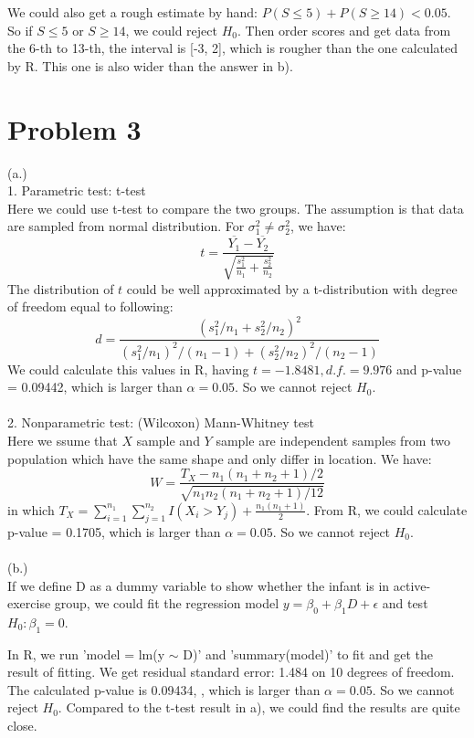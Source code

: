 \documentclass[twoside,11pt]{homework}
\begin{document}
We could also get a rough estimate by hand:
$P(S\le 5) + P(S \ge 14) < 0.05$. 
So if $S \le 5$ or $S \ge 14$, we could reject $H_0$.
Then order scores and get data from the 6-th to 13-th, the interval is [-3, 2], which is rougher than the one calculated by R.
This one is also wider than the answer in b). 
\section*{Problem 3}
(a.) \\
1. Parametric test: t-test\\
Here we could use t-test to compare the two groups.
The assumption is that data are sampled from normal distribution.
For $\sigma_1^2 \neq \sigma_2^2$, we have:
%
\begin{equation}
t = \frac{\overline{Y_1} - \overline{Y_2}}{\sqrt{\frac{s_1^2}{n_1}+\frac{s_2^2}{n_2}}}
\end{equation}
%
The distribution of $t$ could be well approximated by a t-distribution with degree of freedom equal to following:
%
\begin{equation}
d = \frac{(s_1^2/n_1 + s_2^2/n_2)^2}{(s_1^2/n_1)^2/(n_1 - 1) + (s_2^2/n_2)^2/(n_2 - 1)}
\end{equation}
%
We could calculate this values in R, having $t=-1.8481, d.f.=9.976$ and p-value = 0.09442, which is larger than $\alpha = 0.05$.
So we cannot reject $H_0$.
\\\\
2. Nonparametric test: (Wilcoxon) Mann-Whitney test\\
Here we ssume that $X$ sample and $Y$ sample are independent samples from two population which have the same shape and only differ in location.
We have:
%
\begin{equation}
W = \frac{T_X - n_1(n_1+n_2+1)/2}{\sqrt{n_1 n_2 (n_1+n_2+1)/12}}
\end{equation}
%
in which $T_X = \sum_{i=1}^{n_1}\sum_{j=1}^{n_2}I(X_i > Y_j) + \frac{n_1(n_1+1)}{2}$.
From R, we could calculate p-value = 0.1705, which is larger than $\alpha = 0.05$.
So we cannot reject $H_0$.
\\\\
(b.)\\
If we define D as a dummy variable to show whether the infant is in active-exercise group, we could fit the regression model $y=\beta_0+\beta_1 D + \epsilon$ and test $H_0: \beta_1 = 0$.

In R, we run 'model = lm(y $\sim$ D)' and 'summary(model)' to fit and get the result of fitting.
We get residual standard error: 1.484 on 10 degrees of freedom.
The calculated p-value is 0.09434, , which is larger than $\alpha = 0.05$.
So we cannot reject $H_0$.
Compared to the t-test result in a), we could find the results are quite close.
\end{document}
